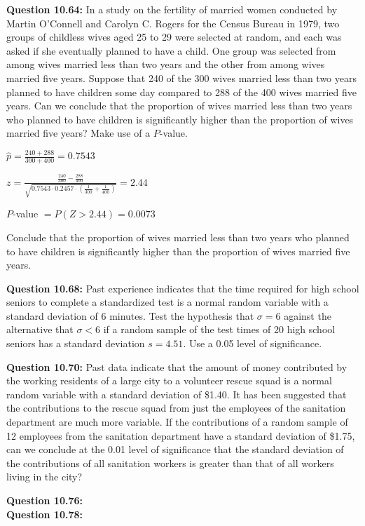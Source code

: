 \documentclass{article}
\begin{document}
\textbf{Question 10.64:}
In a study on the fertility of married women
conducted by Martin O’Connell and Carolyn C. Rogers
for the Census Bureau in 1979, two groups of childless
wives aged 25 to 29 were selected at random, and each
was asked if she eventually planned to have a child.
One group was selected from among wives married
less than two years and the other from among wives
married five years. Suppose that 240 of the 300 wives
married less than two years planned to have children
some day compared to 288 of the 400 wives married
five years. Can we conclude that the proportion of
wives married less than two years who planned to have
children is significantly higher than the proportion of
wives married five years? Make use of a $P$-value.
\begin{description}
    \item $\hat{p}=\frac{240+288}{300+400}=0.7543$
    \item $z = \frac{\frac{240}{300} - \frac{288}{400}}{\sqrt{0.7543\cdot 0.2457\cdot (\frac{1}{300} + \frac{1}{400})}} = 2.44$
    \item $P$-value $= P(Z > 2.44) = 0.0073$
    \item Conclude that the proportion of
    wives married less than two years who planned to have
    children is significantly higher than the proportion of
    wives married five years.
\end{description}

\textbf{Question 10.68:}
Past experience indicates that the time required 
for high school seniors to complete a standardized 
test is a normal random variable with a standard
deviation of 6 minutes. Test the hypothesis that $\sigma = 6$
against the alternative that $\sigma < 6$ if a random sample of
the test times of 20 high school seniors has a standard
deviation $s = 4.51$. Use a 0.05 level of significance.
\newline

\textbf{Question 10.70:}
Past data indicate that the amount of money
contributed by the working residents of a large city to
a volunteer rescue squad is a normal random variable
with a standard deviation of \$1.40. It has been 
suggested that the contributions to the rescue squad from
just the employees of the sanitation department are
much more variable. If the contributions of a random
sample of 12 employees from the sanitation department
have a standard deviation of \$1.75, can we conclude at
the 0.01 level of significance that the standard 
deviation of the contributions of all sanitation workers is
greater than that of all workers living in the city?
\newline

\textbf{Question 10.76:}
\\

\textbf{Question 10.78:}
\end{document}
